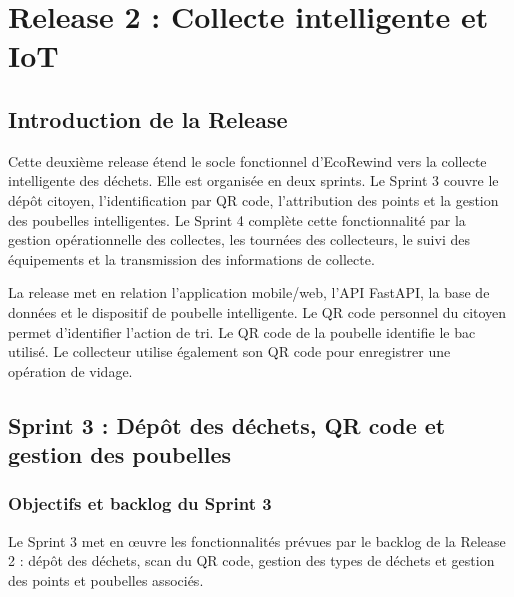 \chapter{Release 2 : Collecte intelligente et IoT}
\label{chap:release2}

\section{Introduction de la Release}
Cette deuxième release étend le socle fonctionnel d'EcoRewind vers la collecte intelligente des déchets. Elle est organisée en deux sprints. Le Sprint 3 couvre le dépôt citoyen, l'identification par QR code, l'attribution des points et la gestion des poubelles intelligentes. Le Sprint 4 complète cette fonctionnalité par la gestion opérationnelle des collectes, les tournées des collecteurs, le suivi des équipements et la transmission des informations de collecte.

La release met en relation l'application mobile/web, l'API FastAPI, la base de données et le dispositif de poubelle intelligente. Le QR code personnel du citoyen permet d'identifier l'action de tri. Le QR code de la poubelle identifie le bac utilisé. Le collecteur utilise également son QR code pour enregistrer une opération de vidage.

\section{Sprint 3 : Dépôt des déchets, QR code et gestion des poubelles}
\subsection{Objectifs et backlog du Sprint 3}
Le Sprint 3 met en œuvre les fonctionnalités prévues par le backlog de la Release 2 : dépôt des déchets, scan du QR code, gestion des types de déchets et gestion des points et poubelles associés.

